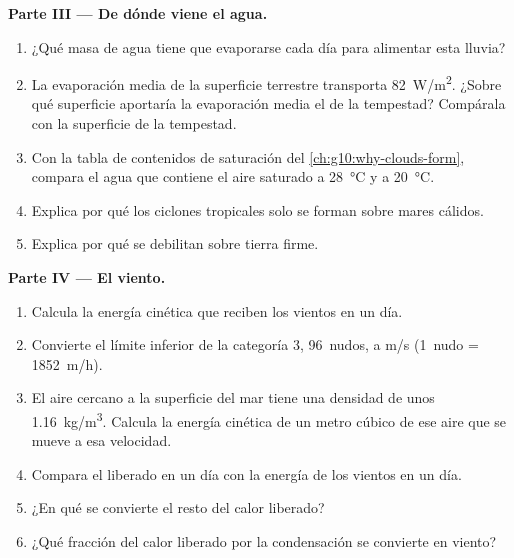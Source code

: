 \begin{problem}
\medskip
\noindent\textbf{Parte III --- De dónde viene el agua.}
\begin{enumerate}[resume]
  \item ¿Qué masa de agua tiene que evaporarse cada día para alimentar esta
        lluvia?
  \item La evaporación media de la superficie terrestre transporta
        \qty{82}{W/m^2}. ¿Sobre qué superficie aportaría la evaporación media
        el  de la tempestad? Compárala con la superficie de la
        tempestad.
  \item Con la tabla de contenidos de saturación del
        \cref{ch:g10:why-clouds-form}, compara el agua que contiene el aire
        saturado a \qty{28}{\degreeCelsius} y a \qty{20}{\degreeCelsius}.
  \item Explica por qué los ciclones tropicales solo se forman sobre mares
        cálidos.
  \item Explica por qué se debilitan sobre tierra firme.
\end{enumerate}

\medskip
\noindent\textbf{Parte IV --- El viento.}
\begin{enumerate}[resume]
  \item Calcula la energía cinética que reciben los vientos en un día.
  \item Convierte el límite inferior de la categoría 3, \num{96}~nudos, a
        \unit{m/s} (\num{1}~nudo = \qty{1852}{m/h}).
  \item El aire cercano a la superficie del mar tiene una densidad de unos
        \qty{1.16}{kg/m^3}. Calcula la energía cinética de un metro cúbico de
        ese aire que se mueve a esa velocidad.
  \item Compara el  liberado en un día con la energía de los
        vientos en un día.
  \item ¿En qué se convierte el resto del calor liberado?
  \item ¿Qué fracción del calor liberado por la condensación se convierte en
        viento?
\end{enumerate}
\end{problem}
